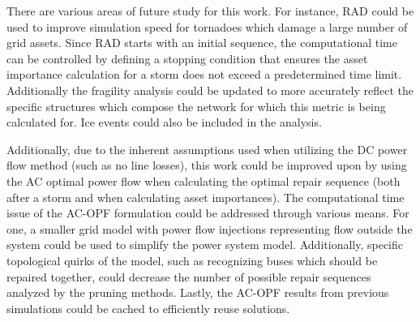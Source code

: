 \documentclass[12pt]{article}
\begin{document}
There are various areas of future study for this work. For instance, RAD could be used to improve simulation speed for tornadoes which damage a large number of grid assets. Since RAD starts with an initial sequence, the computational time can be controlled by defining a stopping condition that ensures the asset importance calculation for a storm does not exceed a predetermined time limit. Additionally the fragility analysis could be updated to more accurately reflect the specific structures which compose the network for which this metric is being calculated for. Ice events could also be included in the analysis. \par
Additionally, due to the inherent assumptions used when utilizing the DC power flow method (such as no line losses), this work could be improved upon by using the AC optimal power flow when calculating the optimal repair sequence (both after a storm and when calculating asset importances). The computational time issue of the AC-OPF formulation could be addressed through various means. For one, a smaller grid model with power flow injections representing flow outside the system could be used to simplify the power system model. Additionally, specific topological quirks of the model, such as recognizing buses which should be repaired together, could decrease the number of possible repair sequences analyzed by the pruning methods. Lastly, the AC-OPF results from previous simulations could be cached to efficiently reuse solutions.





\newpage

\newpage 
\appendix 
\end{document}
